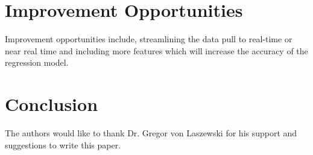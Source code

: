 \documentclass[sigconf]{acmart}
\begin{document}
\section{Improvement Opportunities}
Improvement opportunities include, streamlining the data pull to real-time or near real time and including more features which will increase the accuracy of the regression model. 

\section{Conclusion}


\begin{acks}

  The authors would like to thank Dr. Gregor von Laszewski for his
  support and suggestions to write this paper.
\end{acks}


 


\end{document}
